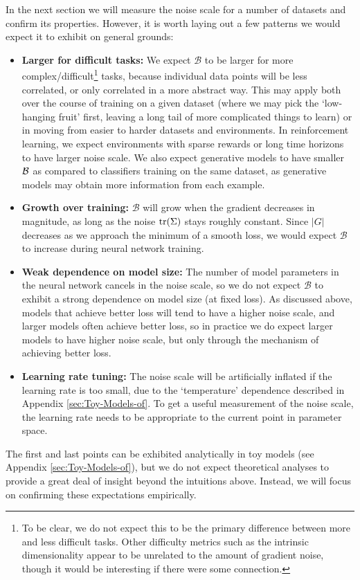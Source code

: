 \documentclass[english]{article}
\newcommand{\CB}{{\cal B}}
\begin{document}
In the next section we will measure the noise scale for a number of datasets and confirm its properties. However, it is worth laying out a few patterns we would expect it to exhibit on general grounds:
\begin{itemize}
\item \textbf{Larger for difficult tasks:} We expect $\mathcal{B}$ to be larger for more complex/difficult\footnote{To be clear, we do not expect this to be the primary difference between more and less difficult tasks.  Other difficulty metrics such as the intrinsic dimensionality \cite{1804.08838} appear to be unrelated to the amount of gradient noise, though it would be interesting if there were some connection.} tasks, because individual data points will be less correlated, or only correlated in a more abstract way. This may apply both over the course of training on a given dataset (where we may pick the `low-hanging fruit' first, leaving a long tail of more complicated things to learn) or in moving from easier to harder datasets and environments.  In reinforcement learning, we expect environments with sparse rewards or long time horizons to have larger noise scale. We also expect generative models to have smaller $\CB$ as compared to classifiers training on the same dataset, as generative models may obtain more information from each example.
\item \textbf{Growth over training:} $\mathcal{B}$ will grow when the gradient decreases in magnitude, as long as the noise ${\rm tr}(\Sigma)$ stays roughly constant. Since $|G|$ decreases as we approach the minimum of a smooth loss, we would expect $\mathcal{B}$ to increase during neural network training.
\item \textbf{Weak dependence on model size:} The number of model parameters in the neural network cancels in the noise scale, so we do not expect $\mathcal{B}$ to exhibit a strong dependence on model size (at fixed loss). As discussed above, models that achieve better loss will tend to have a higher noise scale, and larger models often achieve better loss, so in practice we do expect larger models to have higher noise scale, but only through the mechanism of achieving better loss.
\item \textbf{Learning rate tuning:} The noise scale will be artificially inflated if the learning rate is too small, due to the `temperature' dependence described in Appendix \ref{sec:Toy-Models-of}. To get a useful measurement of the noise scale, the learning rate needs to be appropriate to the current point in parameter space.
\end{itemize}
The first and last points can be exhibited analytically in toy models (see Appendix \ref{sec:Toy-Models-of}), but we do not expect theoretical analyses to provide a great deal of insight beyond the intuitions above. Instead, we will focus on confirming these expectations empirically.
\end{document}
